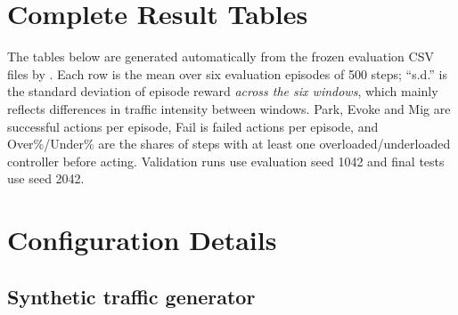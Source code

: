 \chapter{Complete Result Tables}
\label{app:tables}

The tables below are generated automatically from the frozen evaluation CSV files by . Each row is the mean over six evaluation episodes of 500 steps; ``s.d.'' is the standard deviation of episode reward \emph{across the six windows}, which mainly reflects differences in traffic intensity between windows. Park, Evoke and Mig are successful actions per episode, Fail is failed actions per episode, and Over\%/Under\% are the shares of steps with at least one overloaded/underloaded controller before acting. Validation runs use evaluation seed 1042 and final tests use seed 2042.



\chapter{Configuration Details}
\label{app:config}

\section{Synthetic traffic generator}

\begin{table}[H]
\centering
\caption{Per-topology parameters of the synthetic traffic generator (20,000 steps each; seed $42+N$).}
\label{tab:app-gen}
\small
{}
\end{table}

